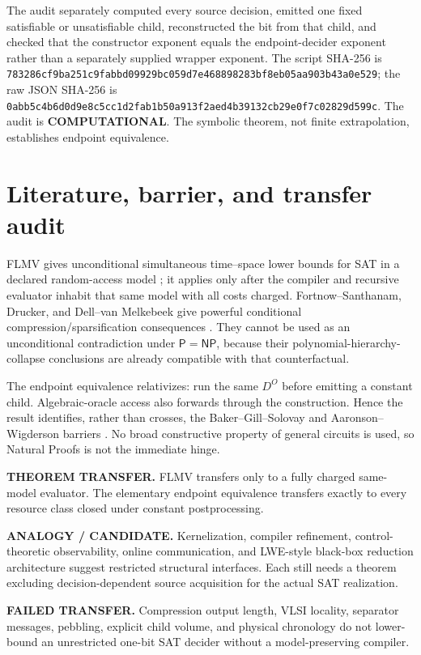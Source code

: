 \documentclass[11pt]{article}
\newcommand{\COMP}{\textbf{COMPUTATIONAL}}
\begin{document}
The audit separately computed every source decision, emitted one fixed
satisfiable or unsatisfiable child, reconstructed the bit from that child,
and checked that the constructor exponent equals the endpoint-decider
exponent rather than a separately supplied wrapper exponent.  The script
SHA-256 is
\nolinkurl{783286cf9ba251c9fabbd09929bc059d7e468898283bf8eb05aa903b43a0e529};
the raw JSON SHA-256 is
\nolinkurl{0abb5c4b6d0d9e8c5cc1d2fab1b50a913f2aed4b39132cb29e0f7c02829d599c}.
The audit is \COMP.  The symbolic theorem, not finite extrapolation,
establishes endpoint equivalence.

\section{Literature, barrier, and transfer audit}

FLMV gives unconditional simultaneous time--space lower bounds for SAT in a
declared random-access model \cite{flmv}; it applies only after the compiler
and recursive evaluator inhabit that same model with all costs charged.
Fortnow--Santhanam, Drucker, and Dell--van Melkebeek give powerful conditional
compression/sparsification consequences \cite{fs,drucker,dvm}.  They cannot
be used as an unconditional contradiction under $\mathsf P=\mathsf{NP}$,
because their polynomial-hierarchy-collapse conclusions are already
compatible with that counterfactual.

The endpoint equivalence relativizes: run the same $D^O$ before emitting a
constant child.  Algebraic-oracle access also forwards through the
construction.  Hence the result identifies, rather than crosses, the
Baker--Gill--Solovay and Aaronson--Wigderson barriers \cite{bgs,aw}.  No broad
constructive property of general circuits is used, so Natural Proofs is not
the immediate hinge.

\begin{description}[leftmargin=0cm,labelwidth=0cm]
\item[] \textbf{THEOREM TRANSFER.}
FLMV transfers only to a fully charged same-model evaluator.  The elementary
endpoint equivalence transfers exactly to every resource class closed under
constant postprocessing.
\item[] \textbf{ANALOGY / CANDIDATE.}
Kernelization, compiler refinement, control-theoretic observability, online
communication, and LWE-style black-box reduction architecture suggest
restricted structural interfaces.  Each still needs a theorem excluding
decision-dependent source acquisition for the actual SAT realization.
\item[] \textbf{FAILED TRANSFER.}
Compression output length, VLSI locality, separator messages, pebbling,
explicit child volume, and physical chronology do not lower-bound an
unrestricted one-bit SAT decider without a model-preserving compiler.
\end{description}
\end{document}
